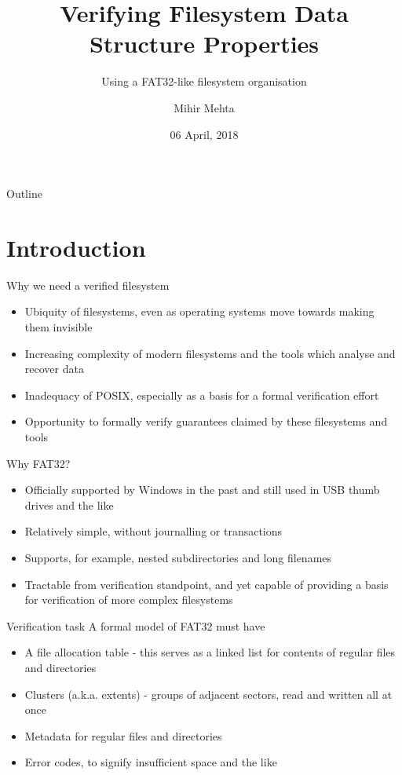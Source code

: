 \documentclass{beamer}
\title{Verifying Filesystem Data Structure Properties}
\subtitle{Using a FAT32-like filesystem organisation}
\author{Mihir Mehta}
\institute{
  Department of Computer Science\\
  University of Texas at Austin\\[1ex]
  \texttt{mihir@cs.utexas.edu}
}
\date{06 April, 2018}
\begin{document}
\begin{frame}[plain]
  \titlepage
\end{frame}

\begin{frame}{Outline}
  \tableofcontents
\end{frame}


\section{Introduction}

\begin{frame}{Why we need a verified filesystem}
  \begin{itemize}
  \item Ubiquity of filesystems, even as operating systems move
    towards making them invisible
  \item Increasing complexity of modern filesystems and the tools
    which analyse and recover data
  \item Inadequacy of POSIX, especially as a basis for a formal
    verification effort
  \item Opportunity to formally verify guarantees claimed by these
    filesystems and tools
  \end{itemize}
\end{frame}

\begin{frame}{Why FAT32?}
  \begin{itemize}
  \item Officially supported by Windows in the past and still used in USB
    thumb drives and the like
  \item Relatively simple, without journalling or transactions
  \item Supports, for example, nested subdirectories and long filenames
  \item Tractable from verification standpoint, and yet capable of
    providing a basis for verification of more complex filesystems
  \end{itemize}
\end{frame}

\begin{frame}{Verification task}
  A formal model of FAT32 must have
  \begin{itemize}
  \item A file allocation table - this serves as a linked list for
    contents of regular files and directories \checkmark
  \item Clusters (a.k.a. extents) - groups of adjacent sectors, read
    and written all at once
  \item Metadata for regular files and directories
  \item Error codes, to signify insufficient space and the like \checkmark
  \end{itemize}
\end{frame}
\end{document}
